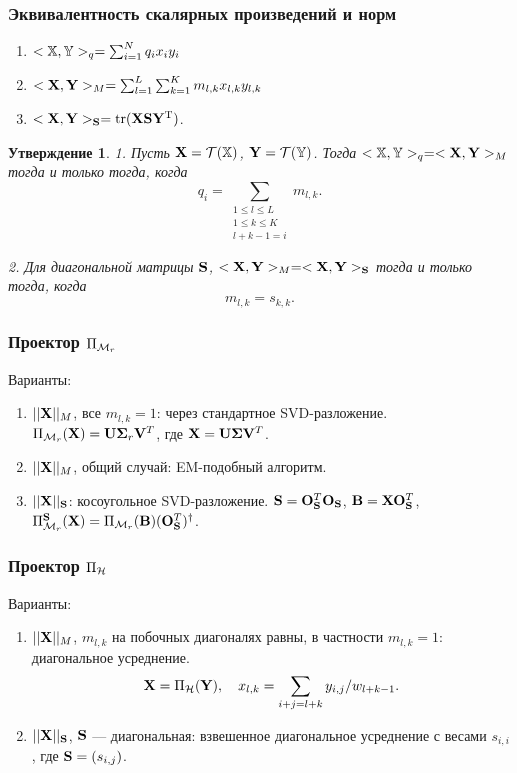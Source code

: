 \documentclass[unicode, notheorems]{beamer}
\newtheorem{proposition}{Утверждение}
\begin{document}
\begin{frame}
    \frametitle{Эквивалентность скалярных произведений и норм}

    \begin{enumerate}
    \item $<\mathbb{X}, \mathbb{Y}>_q = \sum_{i=1}^N q_i x_i  y_i$
    \item $<\mathbf{X}, \mathbf{Y}>_M = \sum_{l = 1}^L \sum_{k = 1}^K m_{l, k} x_{l, k} y_{l, k}$
    \item $<\mathbf{X}, \mathbf{Y}>_{\mathbf{S}} = \text{tr}(\mathbf{X} \mathbf{S} \mathbf{Y}^{\mathrm{T}})$.
    \end{enumerate}
    \begin{proposition}
1. Пусть $\mathbf{X} = \mathcal{T}(\mathbb{X})$,  $\mathbf{Y} = \mathcal{T}(\mathbb{Y})$. Тогда $<\mathbb{X},\mathbb{Y}>_q= <\mathbf{X},\mathbf{Y}>_M$ тогда и только тогда, когда
\begin{equation*}
q_i = \sum_{\substack{1 \le l \le L \\ 1 \le k \le K \\ l+k-1=i}} m_{l,k}.
\end{equation*}

2. Для диагональной матрицы $\mathbf{S}$, $<\mathbf{X},\mathbf{Y}>_M= <\mathbf{X},\mathbf{Y}>_{\mathbf{S}}$ тогда и только тогда, когда
\begin{equation*}
m_{l,k}=s_{k,k}.
\end{equation*}
\end{proposition}

\end{frame}

\begin{frame}
    \frametitle{Проектор $\Pi_{\mathcal{M}_r}$}
    Варианты:
    \begin{enumerate}
    \item $||\mathbf{X}||_M$, все $m_{l, k} = 1$: через стандартное SVD-разложение. $\Pi_{\mathcal{M}_r}(\mathbf{X}) = \mathbf{U} \mathbf{\Sigma}_r \mathbf{V}^T$, где $\mathbf{X} = \mathbf{U} \mathbf{\Sigma} \mathbf{V}^T$.
    \vspace{0.2cm}
    \item $||\mathbf{X}||_M$, общий случай: EM-подобный алгоритм.
    \vspace{0.2cm}
    \item $||\mathbf{X}||_{\mathbf{S}}$: косоугольное SVD-разложение. $\mathbf{S} = \mathbf{O}_{\mathbf{S}}^T \mathbf{O}_{\mathbf{S}}$, $\mathbf{B} = \mathbf{X} \mathbf{O}_{\mathbf{S}}^T$, $\Pi_{\mathcal{M}_r}^{\mathbf{S}}(\mathbf{X}) = \Pi_{\mathcal{M}_r}(\mathbf{B})(\mathbf{O}_{\mathbf{S}}^T)^\dagger$.
    \end{enumerate}
\end{frame}

\begin{frame}
    \frametitle{Проектор $\Pi_{\mathcal{H}}$}
    Варианты:
    \begin{enumerate}
    \item $||\mathbf{X}||_M$, $m_{l,k}$ на побочных диагоналях равны, в частности $m_{l, k} = 1$: диагональное усреднение.
    \begin{equation*}
    \mathbf{X} = \Pi_{\mathcal{H}}(\mathbf{Y}), \quad x_{l,k} = \sum_{i + j = l + k} y_{i, j} / w_{l + k - 1}.
    \end{equation*}
    \item $||\mathbf{X}||_{\mathbf{S}}$, $\mathbf{S}$ --- диагональная: взвешенное диагональное усреднение с весами $s_{i, i}$, где $\mathbf{S} = (s_{i, j})$.
    \end{enumerate}
\end{frame}
\end{document}
